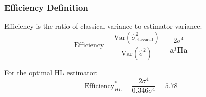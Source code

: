 \subsubsection{ Efficiency Definition}

Efficiency is the ratio of classical variance to estimator variance:
\begin{equation}
\text{Efficiency} = \frac{\text{Var}(\hat{\sigma}^2_{\text{classical}})}{\text{Var}(\hat{\sigma}^2)} = \frac{2\sigma^4}{\mathbf{a}^T\boldsymbol{\Pi}\mathbf{a}}
\end{equation}

For the optimal HL estimator:
\begin{equation}
\text{Efficiency}_{HL}^* = \frac{2\sigma^4}{0.346\sigma^4} = 5.78
\end{equation}











